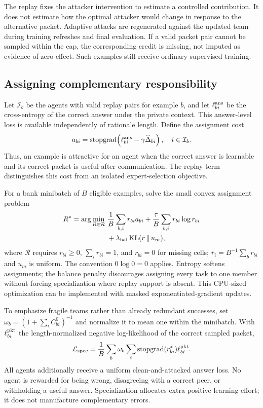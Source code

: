 \documentclass[10pt,twocolumn]{article}
\newcommand{\KL}{\operatorname{KL}}
\newcommand{\sg}{\operatorname{stopgrad}}
\begin{document}
The replay fixes the attacker intervention to estimate a controlled contribution. It does not estimate how the optimal attacker would change in response to the alternative packet. Adaptive attacks are regenerated against the updated team during training refreshes and final evaluation. If a valid packet pair cannot be sampled within the cap, the corresponding credit is missing, not imputed as evidence of zero effect. Such examples still receive ordinary supervised training.

\subsection{Assigning complementary responsibility}
Let $\mathcal I_b$ be the agents with valid replay pairs for example $b$, and let $\ell_{bi}^{\rm ans}$ be the cross-entropy of the correct answer under the private context. This answer-level loss is available independently of rationale length. Define the assignment cost
\begin{equation}
 a_{bi}=\sg\!\left(\ell_{bi}^{\rm ans}
 -\gamma\widehat\Delta_{bi}\right),\quad i\in\mathcal I_b.
 \label{eq:assignment-cost}
\end{equation}
Thus, an example is attractive for an agent when the correct answer is learnable and its correct packet is useful after communication. The replay term distinguishes this cost from an isolated expert-selection objective.

For a bank minibatch of $B$ eligible examples, solve the small convex assignment problem
\begin{align}
 R^*=\arg\min_{R\in\mathcal R}\;&
 \frac{1}{B}\sum_{b,i}r_{bi}a_{bi}
 +\frac{\tau}{B}\sum_{b,i}r_{bi}\log r_{bi}\nonumber\\
 &+\lambda_{\rm bal}\KL(\bar r\,\|\,u_m),
 \label{eq:routing}
\end{align}
where $\mathcal R$ requires $r_{bi}\geq0$, $\sum_i r_{bi}=1$, and $r_{bi}=0$ for missing cells; $\bar r_i=B^{-1}\sum_b r_{bi}$ and $u_m$ is uniform. The convention $0\log0=0$ applies. Entropy softens assignments; the balance penalty discourages assigning every task to one member without forcing specialization where replay support is absent. This CPU-sized optimization can be implemented with masked exponentiated-gradient updates.

To emphasize fragile teams rather than already redundant successes, set $\omega_b=(1+\sum_i C_{bi}^0)^{-1}$ and normalize it to mean one within the minibatch. With $\ell_{bi}^{\rm pkt}$ the length-normalized negative log-likelihood of the correct sampled packet,
\begin{equation}
 \mathcal L_{\rm spec}=\frac{1}{B}\sum_b\omega_b
 \sum_i\sg(r_{bi}^*)\ell_{bi}^{\rm pkt}.
 \label{eq:spec}
\end{equation}
All agents additionally receive a uniform clean-and-attacked answer loss. No agent is rewarded for being wrong, disagreeing with a correct peer, or withholding a useful answer. Specialization allocates extra positive learning effort; it does not manufacture complementary errors.
\end{document}
